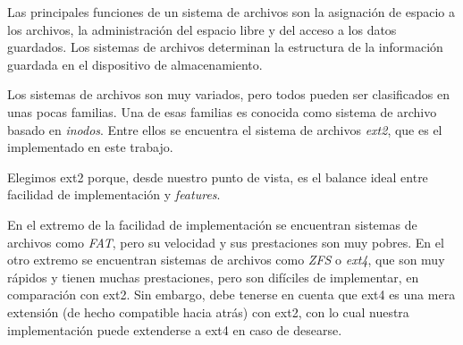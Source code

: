 Las principales funciones de un sistema de archivos son la asignación de espacio a los archivos, la administración del espacio libre y del acceso a los datos guardados.
Los sistemas de archivos determinan la estructura de la información guardada en el dispositivo de almacenamiento.

Los sistemas de archivos son muy variados, pero todos pueden ser clasificados en unas pocas familias.
Una de esas familias es conocida como sistema de archivo basado en \emph{inodos}. Entre ellos se encuentra el sistema de archivos \emph{ext2}, que es el implementado en este trabajo.

Elegimos ext2 porque, desde nuestro punto de vista, es el balance ideal entre facilidad de implementación y \emph{features}.

En el extremo de la facilidad de implementación se encuentran sistemas de archivos como \emph{FAT}, pero su velocidad y sus prestaciones son muy pobres.
En el otro extremo se encuentran sistemas de archivos como \emph{ZFS} o \emph{ext4}, que son muy rápidos y tienen muchas prestaciones, pero son difíciles de implementar, en comparación con ext2.
Sin embargo, debe tenerse en cuenta que ext4 es una mera extensión (de hecho compatible hacia atrás) con ext2, con lo cual nuestra implementación puede extenderse a ext4 en caso de desearse.


